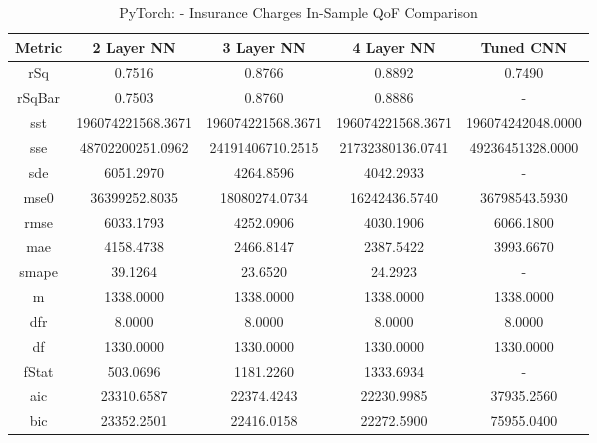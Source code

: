 \documentclass{article}
\begin{document}
\begin{table}[H]
\centering
\caption{PyTorch: - Insurance Charges In-Sample QoF Comparison}
\label{tab:PyTorch: - Insurance Charges In-Sample QoF Comparison}
\begin{tabular}{|c|c|c|c|c|} \hline
Metric & 2 Layer NN & 3 Layer NN & 4 Layer NN & Tuned CNN \\ \hline \hline
rSq & 0.7516 & 0.8766 & 0.8892 & 0.7490 \\ \hline
rSqBar & 0.7503 & 0.8760 & 0.8886 & - \\ \hline
sst & 196074221568.3671 & 196074221568.3671 & 196074221568.3671 & 196074242048.0000 \\ \hline
sse & 48702200251.0962 & 24191406710.2515 & 21732380136.0741 & 49236451328.0000 \\ \hline
sde & 6051.2970 & 4264.8596 & 4042.2933 & - \\ \hline
mse0 & 36399252.8035 & 18080274.0734 & 16242436.5740 & 36798543.5930 \\ \hline
rmse & 6033.1793 & 4252.0906 & 4030.1906 & 6066.1800 \\ \hline
mae & 4158.4738 & 2466.8147 & 2387.5422 & 3993.6670 \\ \hline
smape & 39.1264 & 23.6520 & 24.2923 & - \\ \hline
m & 1338.0000 & 1338.0000 & 1338.0000 & 1338.0000 \\ \hline
dfr & 8.0000 & 8.0000 & 8.0000 & 8.0000 \\ \hline
df & 1330.0000 & 1330.0000 & 1330.0000 & 1330.0000 \\ \hline
fStat & 503.0696 & 1181.2260 & 1333.6934 & - \\ \hline
aic & 23310.6587 & 22374.4243 & 22230.9985 & 37935.2560 \\ \hline
bic & 23352.2501 & 22416.0158 & 22272.5900 & 75955.0400 \\ \hline
\end{tabular}
\end{table}
\end{document}
